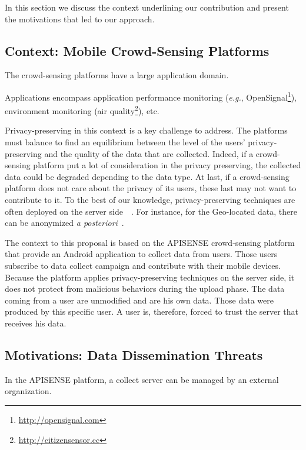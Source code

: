 

In this section we discuss the context underlining our contribution and present the motivations that led to our approach.

\subsection{Context: Mobile Crowd-Sensing Platforms}

The crowd-sensing platforms have a large application domain.

Applications encompass application performance monitoring (\emph{e.g.}, OpenSignal\footnote{\url{http://opensignal.com}}), environment monitoring (air quality\footnote{\url{http://citizensensor.cc}}), etc.

Privacy-preserving in this context is a key challenge to address.
The platforms must balance to find an equilibrium between the level of the users' privacy-preserving and the quality of the data that are collected.
Indeed, if a crowd-sensing platform put a lot of consideration in the privacy preserving, the collected data could be degraded depending to the data type.
At last, if a crowd-sensing platform does not care about the privacy of its users, these last may not want to contribute to it.
To the best of our knowledge, privacy-preserving techniques are often deployed on the server side~\cite{DBLP:conf/mobisys/CorneliusKKPST08}~\cite{DBLP:conf/dais/HadererRS13}.
For instance, for the Geo-located data, there can be anonymized \emph{a posteriori}~\cite{DBLP:conf/icdcs/PrimaultMB15}.

The context to this proposal is based on the APISENSE crowd-sensing platform that provide an Android application to collect data from users.
Those users subscribe to data collect campaign and contribute with their mobile devices.
Because the platform applies privacy-preserving techniques on the server side, it does not protect from malicious behaviors during the upload phase.
The data coming from a user are unmodified and are his own data.
Those data were produced by this specific user.
A user is, therefore, forced to trust the server that receives his data.

\subsection{Motivations: Data Dissemination Threats}

In the APISENSE platform, a collect server can be managed by an external organization.

